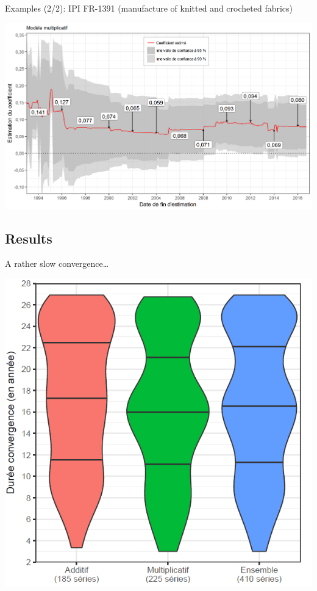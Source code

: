 \documentclass[10pt,xcolor=table,color={dvipsnames,usenames},ignorenonframetext,usepdftitle=false,french]{beamer}
\begin{document}
\begin{frame}{Examples (2/2): IPI FR-1391 (manufacture of knitted and
crocheted fabrics)}

\centering
\includegraphics[width = \textwidth]{img/LYexemple2.png}

\end{frame}

\subsection{Results}\label{results}

\begin{frame}{A rather slow convergence\ldots{}}

\centering
\includegraphics[height = 0.9\textheight]{img/LYconvergence.png}

\end{frame}
\end{document}
